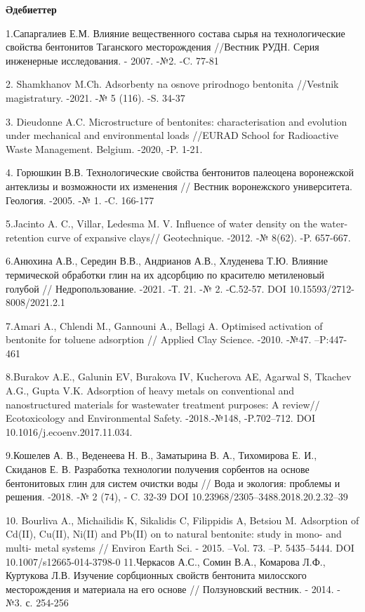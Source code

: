 \begin{center}
{\bfseries Әдебиеттер}
\end{center}

\begin{noparindent}
1.Сапаргалиев Е.М. Влияние вещественного состава сырья на
технологические свойства бентонитов Таганского месторождения //Вестник
РУДН. Серия инженерные исследования. - 2007. -№2. -C. 77-81

2. Shamkhanov M.Ch. Adsorbenty na osnove prirodnogo bentonita //Vestnik
magistratury. -2021. -№ 5 (116). -S. 34-37

3. Dieudonne A.C. Microstructure of bentonites: characterisation and
evolution under mechanical and environmental loads //EURAD School for
Radioactive Waste Management. Belgium. -2020, -P. 1-21.

4. Горюшкин В.В. Технологические свойства бентонитов палеоцена
воронежской антеклизы и возможности их изменения // Вестник воронежского
университета. Геология. -2005. -№ 1. -C. 166-177

5.Jacinto A. C., Villar, Ledesma M. V. Influence of water density on the
water-retention curve of expansive clays// Geotechnique. -2012. -№
8(62). -P. 657-667.

6.Анюхина А.В., Середин В.В., Андрианов А.В., Хлуденева Т.Ю. Влияние
термической обработки глин на их адсорбцию по красителю метиленовый
голубой // Недропользование. -2021. -Т. 21. -№ 2. -С.52-57. DOI
10.15593/2712-8008/2021.2.1

7.Amari A., Chlendi M., Gannouni A., Bellagi A. Optimised activation of
bentonite for toluene adsorption // Applied Clay Science. -2010. -№47.
--P:447-461

8.Burakov A.E., Galunin EV, Burakova IV, Kucherova AE, Agarwal S,
Tkachev A.G., Gupta V.K. Adsorption of heavy metals on conventional and
nanostructured materials for wastewater treatment purposes: A review//
Ecotoxicology and Environmental Safety. -2018.-№148, -P.702--712. DOI
10.1016/j.ecoenv.2017.11.034.

9.Кошелев А. В., Веденеева Н. В., Заматырина В. А., Тихомирова Е. И.,
Скиданов Е. В. Разработка технологии получения сорбентов на основе
бентонитовых глин для систем очистки воды // Вода и экология: проблемы и
решения. -2018. -№ 2 (74), - C. 32-39 DOI
10.23968/2305--3488.2018.20.2.32--39

10. Bourliva A., Michailidis K, Sikalidis C, Filippidis A, Betsiou M.
Adsorption of Cd(II), Cu(II), Ni(II) and Pb(II) on to natural bentonite:
study in mono- and multi- metal systems // Environ Earth Sci. - 2015.
--Vol. 73. --P. 5435--5444. DOI 10.1007/s12665-014-3798-0 11.Черкасов
А.С., Сомин В.А., Комарова Л.Ф., Куртукова Л.В. Изучение сорбционных
свойств бентонита милосского месторождения и материала на его основе //
Ползуновский вестник. - 2014. - №3. с. 254-256
\end{noparindent}

